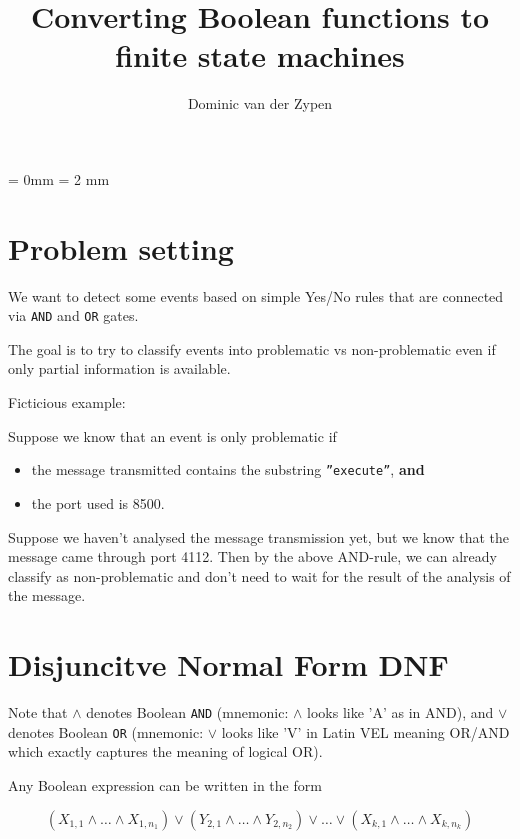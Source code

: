 \documentclass[12pt]{amsart}
\begin{document}
\title{Converting Boolean functions to finite state machines}

\author{Dominic van der Zypen}


\maketitle
\parindent = 0mm
\parskip = 2 mm
\section{Problem setting}
We want to detect some events based on simple
Yes/No rules that are connected via {\tt AND} and
{\tt OR} gates.

The goal is to try to classify events into 
problematic vs non-problematic even if only partial
information is available.

Ficticious example:

Suppose we know that an event is only problematic if
\begin{itemize}
    \item the message transmitted contains the substring 
        {\tt ''execute''}, {\bf and}
    \item the port used is 8500.
\end{itemize}
Suppose we haven't analysed the message transmission yet, 
but we know that the message came through port 4112.
Then by the above AND-rule, we can already classify
as non-problematic and don't need to wait for the result
of the analysis of the message.

\section{Disjuncitve Normal Form DNF}
Note that $\land$ denotes Boolean {\tt AND} (mnemonic:
$\land$ looks like 'A' as in AND), and $\lor$ denotes Boolean {\tt OR}
(mnemonic: $\lor$ looks like 'V' in Latin VEL meaning
OR/AND which exactly captures the meaning of logical OR). 

Any Boolean expression can be written in the form 

$$(X_{1,1}\land\ldots\land X_{1,n_1}) \lor (Y_{2,1}\land\ldots\land Y_{2,n_2})\lor \ldots
\lor (X_{k,1}\land\ldots\land X_{k,n_k})$$
\end{document}
